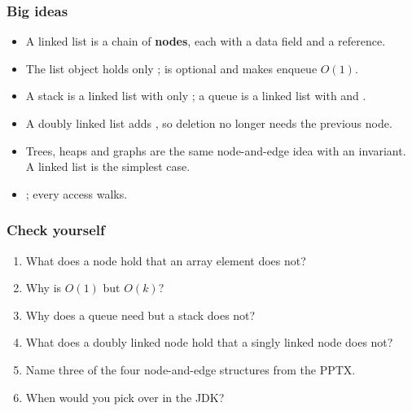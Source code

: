 \documentclass[aspectratio=169,10pt,compress]{beamer}
\begin{document}
\begin{frame}[t,fragile]\frametitle{Big ideas}
  \begin{itemize}
    \item A linked list is a chain of \textbf{nodes}, each with a data
          field and a  reference.
    \item The list object holds only ;  is
          optional and makes enqueue $O(1)$.
    \item A stack is a linked list with only ; a queue is a
          linked list with  and .
    \item A doubly linked list adds , so deletion no
          longer needs the previous node.
    \item Trees, heaps and graphs are the same node-and-edge idea with
          an invariant. A linked list is the simplest case.
    \item {}; every access walks.
  \end{itemize}
\end{frame}

\begin{frame}[t,fragile]\frametitle{Check yourself}
  \begin{enumerate}\small
    \item What does a node hold that an array element does not?
    \item Why is  $O(1)$ but  $O(k)$?
    \item Why does a queue need  but a stack does not?
    \item What does a doubly linked node hold that a singly linked
          node does not?
    \item Name three of the four node-and-edge structures from the PPTX.
    \item When would you pick  over 
          in the JDK?
  \end{enumerate}
\end{frame}
\end{document}
